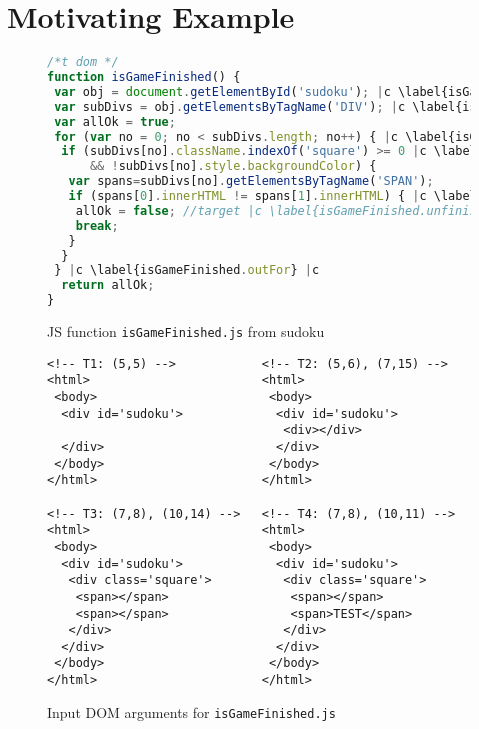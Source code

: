 \section{Motivating Example}
\label{sec.example}

\begin{figure}[!t]
  \begin{lstlisting}[style=htmlcssjs,language=JavaScript]
/*t dom */
function isGameFinished() {
 var obj = document.getElementById('sudoku'); |c \label{isGameFinished.getSudoku} |c
 var subDivs = obj.getElementsByTagName('DIV'); |c \label{isGameFinished.getDivs} |c
 var allOk = true;
 for (var no = 0; no < subDivs.length; no++) { |c \label{isGameFinished.inFor.begin} |c
  if (subDivs[no].className.indexOf('square') >= 0 |c \label{isGameFinished.if1.begin} |c
      && !subDivs[no].style.backgroundColor) {
   var spans=subDivs[no].getElementsByTagName('SPAN');
   if (spans[0].innerHTML != spans[1].innerHTML) { |c \label{isGameFinished.if2.begin} |c
    allOk = false; //target |c \label{isGameFinished.unfinished} |c
    break;
   }
  }
 } |c \label{isGameFinished.outFor} |c
  return allOk;
}
\end{lstlisting}
  \caption{JS function \texttt{isGameFinished.js} from sudoku}
  \label{code.isGameFinished}
\end{figure}

\begin{figure}[!t]
  \begin{lstlisting}[style=htmlcssjs, language=HTML5]
<!-- T1: (5,5) -->            <!-- T2: (5,6), (7,15) -->
<html>                        <html>
 <body>                        <body>
  <div id='sudoku'>             <div id='sudoku'>
                                 <div></div>
  </div>                        </div>
 </body>                       </body>
</html>                       </html>

<!-- T3: (7,8), (10,14) -->   <!-- T4: (7,8), (10,11) -->
<html>                        <html>
 <body>                        <body>
  <div id='sudoku'>             <div id='sudoku'>
   <div class='square'>          <div class='square'>
    <span></span>                 <span></span>
    <span></span>                 <span>TEST</span>
   </div>                        </div>
  </div>                        </div>
 </body>                       </body>
</html>                       </html>
  \end{lstlisting}
  \caption{Input DOM arguments for \texttt{isGameFinished.js}}
  \label{fig.isGameFinished.tests}
\end{figure}

